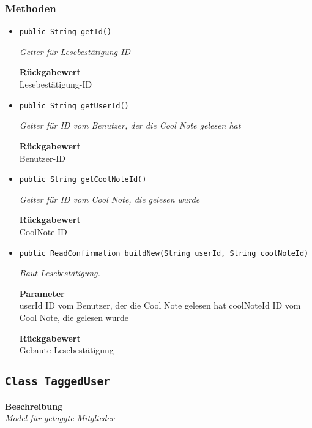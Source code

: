     \subsubsection*{Methoden}
    \begin{itemize}
    	\item{\texttt{public String getId()}}
    	
    	\textit{Getter für Lesebestätigung-ID}
    	
    	
    	
    	\textbf{Rückgabewert} \\
    	Lesebestätigung-ID        \item{\texttt{public String getUserId()}}
    	
    	\textit{Getter für ID vom Benutzer, der die Cool Note gelesen hat}
    	
    	
    	
    	\textbf{Rückgabewert} \\
    	Benutzer-ID        \item{\texttt{public String getCoolNoteId()}}
    	
    	\textit{Getter für ID vom Cool Note, die gelesen wurde}
    	
    	
    	
    	\textbf{Rückgabewert} \\
    	CoolNote-ID        \item{\texttt{public ReadConfirmation buildNew(String userId, String coolNoteId)}}
    	
    	\textit{Baut Lesebestätigung.}
    	
    	\textbf{Parameter} \\
    	userId ID vom Benutzer, der die Cool Note gelesen hat
    	coolNoteId ID vom Cool Note, die gelesen wurde
    	
    	\textbf{Rückgabewert} \\
    	Gebaute Lesebestätigung
    \end{itemize}
    \subsection{\texttt{Class TaggedUser}}
    \textbf{Beschreibung} \\
    \textit{Model für getaggte Mitglieder}
